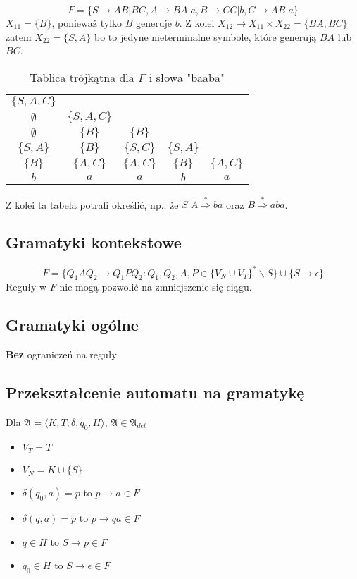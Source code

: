 \documentclass{../notatki}
\begin{document}
$$
F = \{S \rightarrow AB | BC, A \rightarrow BA | a, B \rightarrow CC |
b, C \rightarrow AB | a\}
$$
$X_{11} = \{B\}$, ponieważ tylko $B$ generuje $b$. Z kolei $X_{12}
\rightarrow X_{11} \times X_{22} = \{BA, BC\}$ zatem $X_{22} = \{S, A\}$ bo to
jedyne nieterminalne symbole, które generują $BA$ lub $BC$.
\begin{table*}[h]
  \centering
  \begin{tabular}{|ccccc}
    $\{S, A, C\}$ & & & & \\
    $\emptyset$ & $\{S, A, C\}$ & & & \\
    $\emptyset$ & $\{B\}$ & $\{B\}$ & & \\
    $\{S, A\}$ & $\{B\}$ & $\{S, C\}$ & $\{S, A\}$ & \\
    $\{B\}$ & $\{A, C\}$ & $\{A, C\}$ & $\{B\}$ & $\{A, C\}$ \\
    \hline
    $b$ & $a$ & $a$ & $b$ & $a$
  \end{tabular}
  \caption{Tablica trójkątna dla $F$ i słowa "baaba"}
\end{table*}

Z kolei ta tabela potrafi określić, np.: że $S | A
\stackrel{*}{\Rightarrow} ba$ oraz $B \stackrel{*}{\Rightarrow} aba$.

\subsection{Gramatyki kontekstowe}

$$
F = \{Q_1AQ_2 \rightarrow Q_1PQ_2 : Q_1, Q_2, A, P \in \{V_N \cup
V_T\}^* \backslash S\} \cup \{S \rightarrow \epsilon\}
$$
Reguły w $F$ nie mogą pozwolić na zmniejszenie się ciągu.

\subsection{Gramatyki ogólne}

\textbf{Bez} ograniczeń na reguły

\subsection{Przekształcenie automatu na gramatykę}

Dla $\mathfrak{A} = \langle K,T,\delta,q_0,H \rangle$, $\mathfrak{A}
\in \mathfrak{A}_{det}$

\begin{itemize}
  \item $V_T = T$
  \item $V_N = K \cup \{S\}$
  \item $\delta(q_0, a) = p$ to $p \rightarrow a \in F$
  \item $\delta(q, a) = p$ to $p \rightarrow qa \in F$
  \item $q \in H$ to $S \rightarrow p \in F$
  \item $q_0 \in H$ to $S \rightarrow \epsilon \in F$
\end{itemize}
\end{document}
